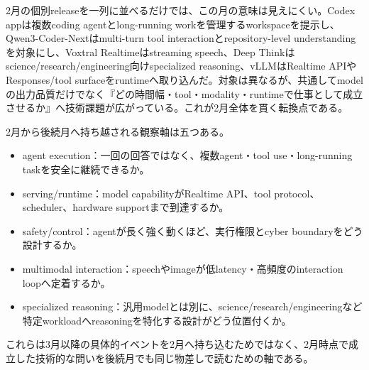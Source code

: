 2月の個別releaseを一列に並べるだけでは、この月の意味は見えにくい。Codex appは複数coding agentとlong-running workを管理するworkspaceを提示し、Qwen3-Coder-Nextはmulti-turn tool interactionとrepository-level understandingを対象にし、Voxtral Realtimeはstreaming speech、Deep Thinkはscience/research/engineering向けspecialized reasoning、vLLMはRealtime APIやResponses/tool surfaceをruntimeへ取り込んだ。対象は異なるが、共通してmodelの出力品質だけでなく『どの時間幅・tool・modality・runtimeで仕事として成立させるか』へ技術課題が広がっている。これが2月全体を貫く転換点である。\autocite{src-15823ae5556e,src-5041feb6f87f,src-d8b7c1c36830,src-dd5d9b8662f3,src-eac8dfbeb78c}


2月から後続月へ持ち越される観察軸は五つある。

\begin{itemize}
  \item agent execution：一回の回答ではなく、複数agent・tool use・long-running taskを安全に継続できるか。
  \item serving/runtime：model capabilityがRealtime API、tool protocol、scheduler、hardware supportまで到達するか。
  \item safety/control：agentが長く強く動くほど、実行権限とcyber boundaryをどう設計するか。
  \item multimodal interaction：speechやimageが低latency・高頻度のinteraction loopへ定着するか。
  \item specialized reasoning：汎用modelとは別に、science/research/engineeringなど特定workloadへreasoningを特化する設計がどう位置付くか。
\end{itemize}

これらは3月以降の具体的イベントを2月へ持ち込むためではなく、2月時点で成立した技術的な問いを後続月でも同じ物差しで読むための軸である。
\autocite{src-15823ae5556e,src-4a841ea7ec7c,src-5041feb6f87f,src-9aba7995b6a5,src-d8b7c1c36830,src-dd5d9b8662f3,src-dd64fe3084a4}

